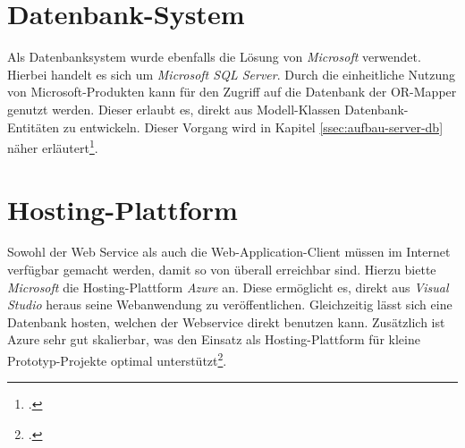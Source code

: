 \section{Datenbank-System}
\label{sec:DB-System}
Als Datenbanksystem wurde ebenfalls die Lösung von \textit{Microsoft} verwendet. Hierbei handelt es sich um \textit{Microsoft SQL Server}. Durch die einheitliche Nutzung von Microsoft-Produkten kann für den Zugriff auf die Datenbank der \ac{OR-Mapper} genutzt werden. Dieser erlaubt es, direkt aus Modell-Klassen Datenbank-Entitäten zu entwickeln. Dieser Vorgang wird in Kapitel \ref{ssec:aufbau-server-db} näher erläutert\footcite{online:SQLServer}.
\section{Hosting-Plattform}
\label{sec:Hosting-Plattform}
Sowohl der Web Service als auch die Web-Application-Client müssen im Internet verfügbar gemacht werden, damit so von überall erreichbar sind. Hierzu biette \textit{Microsoft} die Hosting-Plattform \textit{Azure} an. Diese ermöglicht es, direkt aus \textit{Visual Studio} heraus seine Webanwendung zu veröffentlichen. Gleichzeitig lässt sich eine Datenbank hosten, welchen der Webservice direkt benutzen kann. Zusätzlich ist Azure sehr gut skalierbar, was den Einsatz als Hosting-Plattform für kleine Prototyp-Projekte optimal unterstützt\footcite{online:Azure}. 